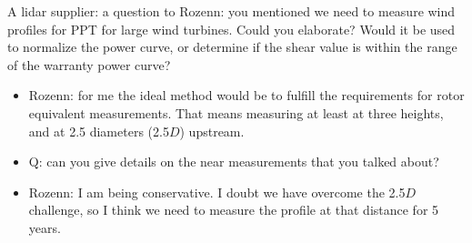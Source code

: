 A lidar supplier: a question to Rozenn: you mentioned we need to measure wind profiles for PPT for large wind turbines. Could you elaborate? Would it be used to normalize the power curve, or determine if the shear value is within the range of the warranty power curve?
\begin{itemize}
    \item Rozenn: for me the ideal method would be to fulfill the requirements for rotor equivalent measurements. That means measuring at least at three heights, and at 2.5 diameters (2.5$D$) upstream. 
    \item Q: can you give details on the near measurements that you talked about?
    \item Rozenn: I am being conservative. I doubt we have overcome the 2.5$D$ challenge, so I think we need to measure the profile at that distance for 5 years.
\end{itemize}

